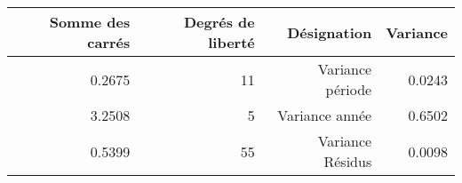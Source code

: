 \begin{tabular}{rrrr}
\toprule
    \textbf{Somme des carrés} & \textbf{Degrés de liberté} & \textbf{Désignation} & \textbf{Variance} \\
\midrule
    0.2675 & 11 & Variance période&  0.0243  \\ 
    3.2508 & 5  & Variance année & 0.6502  \\ 
    0.5399 & 55 & Variance Résidus &0.0098  \\ 
\bottomrule 
\end{tabular}